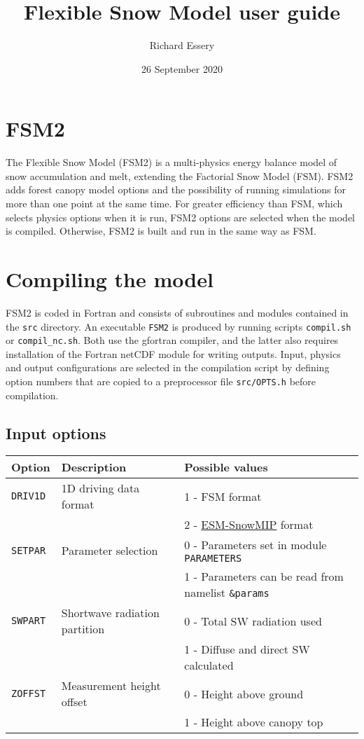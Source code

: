 \documentclass{article}
\title{Flexible Snow Model user guide}
\author{Richard Essery}
\date{26 September 2020}
\begin{document}
\maketitle
\parindent0pt

\section{FSM2}

The Flexible Snow Model (FSM2) is a multi-physics energy balance model of snow accumulation and melt, extending the Factorial Snow Model (FSM). FSM2 adds forest canopy model options and the possibility of running simulations for more than one point at the same time.
For greater efficiency than FSM, which selects physics options when it is run, FSM2 options are selected when the model is compiled. Otherwise, FSM2 is built and run in the same way as FSM.

\section{Compiling the model}

FSM2 is coded in Fortran and consists of subroutines and modules contained in the {\tt src} directory. An executable {\tt FSM2} is produced by running scripts {\tt compil.sh} or {\tt compil\_nc.sh}. Both use the gfortran compiler, and the latter also requires installation of the Fortran netCDF module for writing outputs. Input, physics and output configurations are selected in the compilation script by defining option numbers that are copied to a preprocessor file {\tt src/OPTS.h} before compilation.

\subsection{Input options }
\begin{longtable}{|l|l|l|} \hline
Option       & Description & Possible values \\ \hline
{\tt DRIV1D} & 1D driving data format
&   1 - FSM format \\
& & 2 - \href{https://www.geos.ed.ac.uk/~ressery/ESM-SnowMIP/ESMSnowMIP_Reference_sites.pdf}{ESM-SnowMIP} format \\ \hline
{\tt SETPAR} & Parameter selection
&   0 - Parameters set in module {\tt PARAMETERS} \\
& & 1 - Parameters can be read from namelist {\tt\&params} \\ \hline
{\tt SWPART} & Shortwave radiation partition
&   0 - Total SW radiation used \\
& & 1 - Diffuse and direct SW calculated \\ \hline
{\tt ZOFFST} & Measurement height offset
&   0 - Height above ground \\
& & 1 - Height above canopy top \\ \hline
\end{longtable}
\end{document}
